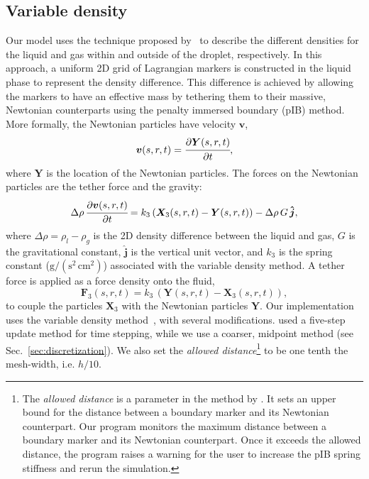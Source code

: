 \documentclass[%
 aip,
 amsmath,amssymb,
 reprint,
 floatfix
]{revtex4-1}
\begin{document}
\subsection{Variable density}
Our model uses the technique proposed by~\citet{kim2008numerical} to describe the different densities for the liquid and gas within and outside of the droplet, respectively. In this approach, a uniform 2D grid of Lagrangian markers is constructed in the liquid phase to represent the density difference. This difference is achieved by allowing the markers to have an effective mass by tethering them to their massive, Newtonian counterparts using the penalty immersed boundary (pIB) method. More formally, the Newtonian particles have velocity $\boldsymbol{v}$, 
\begin{equation}
\bm{v}(s,r,t) = \cfrac{\partial \bm{Y}(s,r,t)}{\partial t},
\end{equation}
where $\boldsymbol{Y}$ is the location of the Newtonian particles. 
The forces on the Newtonian particles are the tether force and the gravity: 
\begin{equation}
\Delta \rho \, \cfrac{\partial \bm{v}(s,r,t)}{\partial t} = k_3 \, (
    \bm{X}_3(s,r,t) - \bm{Y}(s,r,t)
) - \Delta \rho \, G \, \bm{\hat{j}},
\end{equation}
where $\Delta \rho = \rho_l - \rho_g$ is the 2D density difference between the liquid and gas, $G$ is the gravitational constant, $\bm{\hat{j}}$ is the vertical unit vector, and $k_3$ is the spring constant ($\text{g}/(\text{s}^2\,\text{cm}^2)$) associated with the variable density method. A tether force is applied as a force density onto the fluid,
\begin{equation}
\bm{F}_3(s,r,t) = k_3 \, (
    \bm{Y}(s,r,t) - \bm{X}_3(s,r,t)
), 
\end{equation}
to couple the particles $\bm{X}_3$ with the Newtonian particles $\bm{Y}$. Our implementation uses the variable density method~\cite{kim2008numerical}, with several modifications. \citet{kim2008numerical} used a five-step update method for time stepping, while we use a coarser, midpoint method (see Sec.~\ref{sec:discretization}). We also set the \textit{allowed distance}\footnote{The \textit{allowed distance} is a parameter in the method by \citet{kim2008numerical}. It sets an upper bound for the distance between a boundary marker and its Newtonian counterpart. Our program monitors the maximum distance between a boundary marker and its Newtonian counterpart. Once it exceeds the allowed distance, the program raises a warning for the user to increase the pIB spring stiffness and rerun the simulation.} to be one tenth the mesh-width, i.e. $h/10$. 
\end{document}
